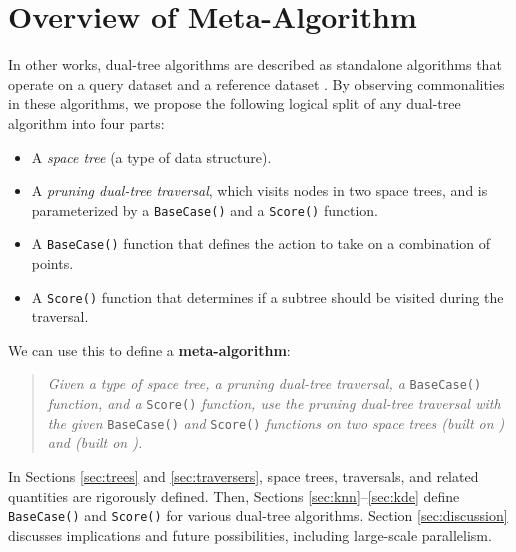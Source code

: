 \documentclass{article}
\begin{document}
\section{Overview of Meta-Algorithm}
\label{sec:overview}

In other works, dual-tree algorithms are described as standalone algorithms that
operate on a query dataset  and a reference dataset .  By observing
commonalities in these algorithms, we propose the following logical split of any
dual-tree algorithm into four parts:

\vspace*{-0.7em}
\begin{itemize}
  \item A \textit{space tree} (a type of data structure).

  \item A \textit{pruning dual-tree traversal}, which visits nodes in two space
trees, and is parameterized by a \texttt{BaseCase()} and a \texttt{Score()}
function.

  \item A \texttt{BaseCase()} function that defines the action to take on a
combination of points.

  \item A \texttt{Score()} function that determines if a subtree should be
visited during the traversal.
\end{itemize}
\vspace*{-0.7em}

We can use this to define a {\bf meta-algorithm}:

\vspace*{-0.7em}
\begin{quote}
\textit{Given a type of space tree, a pruning dual-tree traversal, a
}\texttt{BaseCase()}\textit{ function, and a }\texttt{Score()}\textit{ function,
use the pruning dual-tree traversal with the given }\texttt{BaseCase()}\textit{
and }\texttt{Score()}\textit{ functions on two space trees 
(built on ) and  (built on ).}
\end{quote}
\vspace*{-0.7em}

In Sections \ref{sec:trees} and \ref{sec:traversers}, space trees, traversals,
and related quantities are rigorously defined.  Then, Sections
\ref{sec:knn}--\ref{sec:kde} define \texttt{BaseCase()} and \texttt{Score()}
for various dual-tree algorithms.  Section \ref{sec:discussion} discusses
implications and future possibilities, including large-scale parallelism.
\end{document}
